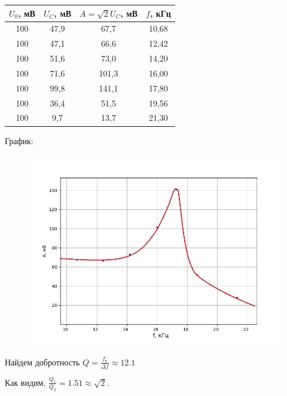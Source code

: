 \documentclass[a4paper,12pt]{article} %
\begin{document}
\begin{table}[h!]
	\centering
	\begin{tabular}{|c|c|c|c|}
		\hline
		$U_0$, мВ & $U_C$, мВ & $A = \sqrt{2}U_C$, мВ & $f$, кГц \\ \hline
		100       & 47,9      & 67,7                  & 10,68   \\ \hline
		100       & 47,1      & 66,6                  & 12,42   \\ \hline
		100       & 51,6      & 73,0                  & 14,20   \\ \hline
		100       & 71,6      & 101,3                 & 16,00   \\ \hline
		100       & 99,8      & 141,1                 & 17,80   \\ \hline
		100       & 36,4      & 51,5                  & 19,56   \\ \hline
		100       & 9,7       & 13,7                  & 21,30   \\ \hline
	\end{tabular}
\end{table}

График:
\newpage

\begin{figure}[h!]
	\centering
	\includegraphics[scale=0.85]{Рез2.png}
\end{figure}

Найдем добротность $Q = \frac{f_{\text{р}}}{\Delta f} \approx 12.1$

Как видим, $\frac{Q_1}{Q_2} = 1.51 \approx \sqrt{2}$.
\end{document}
